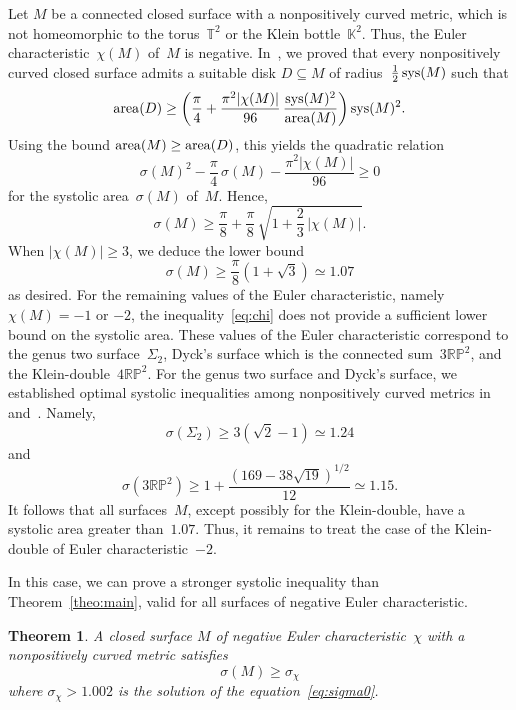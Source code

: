 \documentclass[12pt,reqno]{amsart}
\newtheorem{theorem}{Theorem}[section]
\theoremstyle{definition}
\numberwithin{equation}{section}
\newcommand\T {{\mathbb T}}
\newcommand\K {{\mathbb K}}
\DeclareMathOperator{\area}{{\rm area}}
\DeclareMathOperator{\sys}{{\rm sys}}
\newcommand{\RP}{{\mathbb R\mathbb P}}
\numberwithin{equation}{section}
\begin{document}

Let $M$ be a connected closed surface with a nonpositively curved
metric, which is not homeomorphic to the torus~$\T^2$ or the Klein
bottle~$\K^2$.  Thus, the Euler characteristic~$\chi(M)$ of~$M$ is
negative.  In~\cite{KS24}, we proved that every nonpositively curved
closed surface admits a suitable disk $D \subseteq M$ of
radius~$\frac{1}{2} \sys(M)$ such that
\begin{equation} \label{eq:D}
\area(D) \geq \left( \frac{\pi}{4} + \frac{\pi^2 |\chi(M)|}{96} \, \frac{\sys(M)^2}{\area(M)} \right) \sys(M)^2.
\end{equation}
Using the bound $\area(M) \geq \area(D)$, this yields the quadratic
relation
\[
\sigma(M)^2 - \frac{\pi}{4} \, \sigma(M) - \frac{\pi^2 |\chi(M)|}{96} \geq 0
\]
for the systolic area~$\sigma(M)$ of~$M$.
Hence,
\begin{equation} \label{eq:chi}
\sigma(M) \geq \frac{\pi}{8} + \frac{\pi}{8} \, \sqrt{1 + \frac{2}{3} \, | \chi(M) |}.
\end{equation}
When $|\chi(M)| \geq 3$, we deduce the lower bound
\begin{equation} \label{eq:8}
\sigma(M) \geq \frac{\pi}{8} (1+\sqrt{3}) \simeq 1.07
\end{equation}
as desired.  For the remaining values of the Euler characteristic,
namely $\chi(M)=-1$ or $-2$, the inequality~\eqref{eq:chi} does not
provide a sufficient lower bound on the systolic area.  These values
of the Euler characteristic correspond to the genus two
surface~$\Sigma_2$, Dyck's surface which is the connected
sum~$3\RP^2$, and the Klein-double~$4\RP^2$.  For the genus two
surface and Dyck's surface, we established optimal systolic
inequalities among nonpositively curved metrics in~\cite{KS06}
and~\cite{KS15}.  Namely,
\[
\sigma(\Sigma_2) \geq 3 (\sqrt{2}-1) \simeq 1.24
\]
and
\[
\sigma(3 \RP^2) \geq 1 + \frac{(169-38\sqrt{19})^{1/2}}{12} \simeq
1.15.
\]
It follows that all surfaces~$M$, except possibly for the
Klein-double, have a systolic area greater than~$1.07$.  Thus, it
remains to treat the case of the Klein-double of Euler
characteristic~$-2$.

\medskip

In this case, we can prove a stronger systolic inequality than Theorem~\ref{theo:main}, valid for all surfaces of negative Euler characteristic.

\begin{theorem} \label{theo:B}
A closed surface $M$ of negative Euler characteristic~$\chi$ with a
nonpositively curved metric satisfies
\[
\sigma(M) \geq \sigma_\chi
\]
where $\sigma_\chi > 1.002$ is the solution of the equation~\eqref{eq:sigma0}.
\end{theorem}
\end{document}
